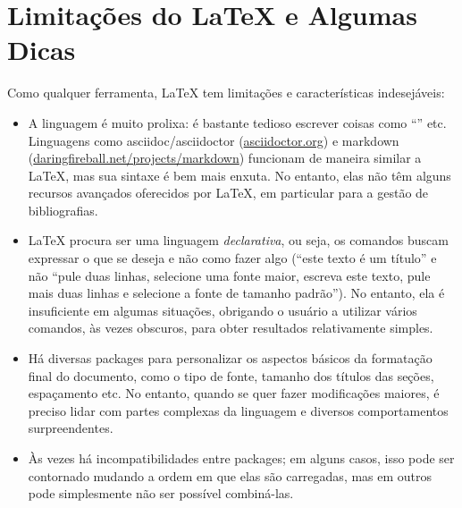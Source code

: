 \section{Limitações do \LaTeX{} e Algumas Dicas}
\label{sec:limitations}

Como qualquer ferramenta, \LaTeX{} tem limitações e características
indesejáveis:

\begin{itemize}
    \item A linguagem é muito prolixa: é bastante tedioso escrever
    coisas como ``'' etc. Linguagens
    como asciidoc/asciidoctor (\url{asciidoctor.org}) e markdown
    (\url{daringfireball.net/projects/markdown}) funcionam de
    maneira similar a \LaTeX{}, mas sua sintaxe é bem mais enxuta.
    No entanto, elas não têm alguns recursos avançados oferecidos
    por \LaTeX{}, em particular para a gestão de bibliografias.

    \item \LaTeX{} procura ser uma linguagem \emph{declarativa}, ou seja,
    os comandos buscam expressar o que se deseja e não como fazer algo
    (``este texto é um título'' e não ``pule duas linhas, selecione uma
    fonte maior, escreva este texto, pule mais duas linhas e selecione a
    fonte de tamanho padrão''). No entanto, ela é insuficiente em algumas
    situações, obrigando o usuário a utilizar vários comandos, às vezes
    obscuros, para obter resultados relativamente simples.

    \item Há diversas packages para personalizar os aspectos básicos
    da formatação final do documento, como o tipo de fonte, tamanho dos
    títulos das seções, espaçamento etc. No entanto, quando se quer
    fazer modificações maiores, é preciso lidar com partes complexas da
    linguagem e diversos comportamentos surpreendentes.

    \item Às vezes há incompatibilidades entre packages; em alguns casos,
    isso pode ser contornado mudando a ordem em que elas são carregadas,
    mas em outros pode simplesmente não ser possível combiná-las.


\end{itemize}
